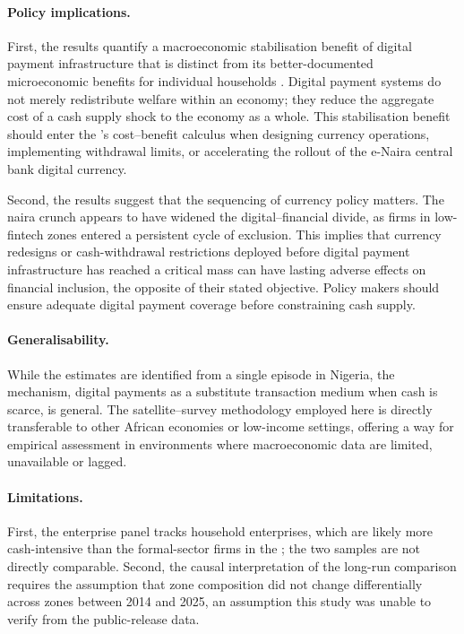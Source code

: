 \paragraph{Policy implications.}
First, the results quantify a
macroeconomic stabilisation benefit of digital payment infrastructure that
is distinct from its better-documented microeconomic benefits for individual
households \citep{jack2014risk,suri2016mobile}. Digital payment systems do
not merely redistribute welfare within an economy; they reduce the aggregate
cost of a cash supply shock to the economy as a whole. This stabilisation
benefit should enter the \CBN's cost--benefit calculus when designing currency
operations, implementing withdrawal limits, or accelerating the rollout of
the e-Naira central bank digital currency.

Second, the results suggest that the sequencing of currency policy matters.
The naira crunch appears to have widened the digital--financial divide, as
firms in low-fintech zones entered a persistent cycle of exclusion. This
implies that currency redesigns or cash-withdrawal restrictions deployed
before digital payment infrastructure has reached a critical mass can have
lasting adverse effects on financial inclusion, the opposite of their stated
objective. Policy makers should ensure adequate digital payment coverage
before constraining cash supply.

\paragraph{Generalisability.}
While the estimates are identified from a single episode in Nigeria, the
mechanism, digital payments as a substitute transaction medium when cash is
scarce, is general. The satellite--survey methodology employed here
is directly transferable to other African economies or low-income settings, 
offering a way for empirical assessment in environments where macroeconomic data are limited, unavailable or lagged.

\paragraph{Limitations.}
First, the \NLPS{} enterprise panel tracks
household enterprises, which are likely more cash-intensive than the
formal-sector firms in the \WBES{}; the two samples are not directly
comparable. Second, the causal interpretation of the long-run \WBES{}
comparison requires the assumption that zone composition did not change
differentially across zones between 2014 and 2025, an assumption this study was unable to
verify from the public-release data.
